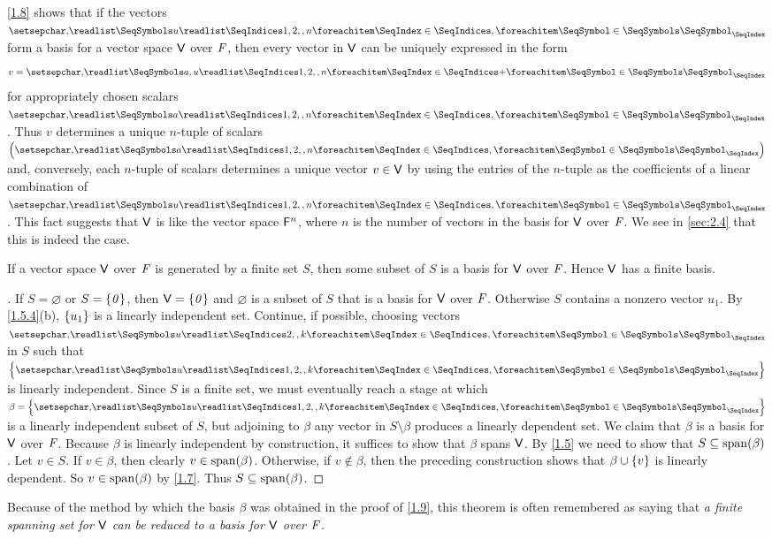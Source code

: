 \begin{note}
	\cref{1.8} shows that if the vectors \(\seq{u}{1,2,,n}\) form a basis for a vector space \(\mathsf{V}\) over \(\mathit{F}\), then every vector in \(\mathsf{V}\) can be uniquely expressed in the form
	\[
		v = \seq[+]{a,u}{1,2,,n}
	\]
	for appropriately chosen scalars \(\seq{a}{1,2,,n}\).
	Thus \(v\) determines a unique \(n\)-tuple of scalars \(\tuple{a}{1,2,,n}\) and, conversely, each \(n\)-tuple of scalars determines a unique vector \(v \in \mathsf{V}\) by using the entries of the \(n\)-tuple as the coefficients of a linear combination of \(\seq{u}{1,2,,n}\).
	This fact suggests that \(\mathsf{V}\) is like the vector space \(\mathsf{F}^n\), where \(n\) is the number of vectors in the basis for \(\mathsf{V}\) over \(\mathit{F}\).
	We see in \cref{sec:2.4} that this is indeed the case.
\end{note}

\begin{thm}\label{1.9}
	If a vector space \(\mathsf{V}\) over \(\mathit{F}\) is generated by a finite set \(S\), then some subset of \(S\) is a basis for \(\mathsf{V}\) over \(\mathit{F}\).
	Hence \(\mathsf{V}\) has a finite basis.
\end{thm}

\begin{proof}[]
	If \(S = \varnothing\) or \(S = \left\lbrace\mathit{0}\right\rbrace\), then \(\mathsf{V} = \left\lbrace\mathit{0}\right\rbrace\) and \(\varnothing\) is a subset of \(S\) that is a basis for \(\mathsf{V}\) over \(\mathit{F}\).
	Otherwise \(S\) contains a nonzero vector \(u_1\).
	By \cref{1.5.4}(b), \(\left\lbrace u_1\right\rbrace\) is a linearly independent set.
	Continue, if possible, choosing vectors \(\seq{u}{2,,k}\) in \(S\) such that \(\set{\seq{u}{1,2,,k}}\) is linearly independent.
	Since \(S\) is a finite set, we must eventually reach a stage at which \(\beta = \set{\seq{u}{1,2,,k}}\) is a linearly independent subset of \(S\), but adjoining to \(\beta\) any vector in \(S \setminus \beta\) produces a linearly dependent set.
	We claim that \(\beta\) is a basis for \(\mathsf{V}\) over \(\mathit{F}\).
	Because \(\beta\) is linearly independent by construction, it suffices to show that \(\beta\) spans \(\mathsf{V}\).
	By \cref{1.5} we need to show that \(S \subseteq \spn{\beta}\).
	Let \(v \in S\).
	If \(v \in \beta\), then clearly \(v \in \spn{\beta}\).
	Otherwise, if \(v \notin \beta\), then the preceding construction shows that \(\beta \cup \left\lbrace v\right\rbrace\) is linearly dependent.
	So \(v \in \spn{\beta}\) by \cref{1.7}.
	Thus \(S \subseteq \spn{\beta}\).
\end{proof}

\begin{note}
	Because of the method by which the basis \(\beta\) was obtained in the proof of \cref{1.9}, this theorem is often remembered as saying that \emph{a finite spanning set for \(\mathsf{V}\) can be reduced to a basis for \(\mathsf{V}\) over \(\mathit{F}\).}
\end{note}

